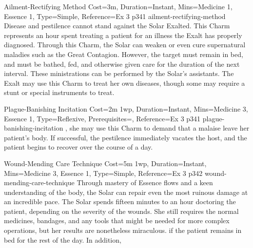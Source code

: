 \begin{Charm}{Ailment-Rectifying Method}{
    Cost=3m,
    Duration=Instant,
    Mins={Medicine 1, Essence 1},
    Type=Simple,
    Reference=Ex 3 p341
}{ailment-rectifying-method}
    Disease  and  pestilence  cannot  stand  against  the  Solar Exalted. This
    Charm represents an hour spent treating a patient for an illness the Exalt
    has properly diagnosed. 
    Through this Charm, the Solar can weaken or even cure supernatural maladies
    such as the Great Contagion. However, the target must remain in bed, and
    must be bathed, fed, and otherwise given care for the duration of the next
    interval. These ministrations can be performed by the Solar’s assistants.
    The Exalt may use this Charm to treat her own diseases, though some may
    require a stunt or special instruments to treat.
\end{Charm}

\begin{Charm}{Plague-Banishing Incitation}{
    Cost=2m 1wp,
    Duration=Instant,
    Mins={Medicine 3, Essence 1},
    Type=Reflexive,
    Prerequisites=,
    Reference=Ex 3 p341
}{plague-banishing-incitation}
    , she may use this Charm to demand that a malaise leave her
    patient’s body.  If successful, the
    pestilence immediately vacates the host, and the patient begins to recover
    over the course of a day. 
\end{Charm}

\begin{Charm}{Wound-Mending Care Technique}{
    Cost=5m 1wp,
    Duration=Instant,
    Mins={Medicine 3, Essence 1},
    Type=Simple,
    Reference=Ex 3 p342
}{wound-mending-care-technique}
    Through mastery of Essence flows and a keen understanding of the body, the
    Solar can repair even the most ruinous damage at an incredible pace. The
    Solar spends fifteen minutes to an hour doctoring the patient, depending on
    the severity of the wounds. She still requires the normal medicines,
    bandages, and any tools that might be needed for more complex operations,
    but her results are nonetheless miraculous.  if the patient remains in bed for the rest of the day. In
    addition, 
\end{Charm}


